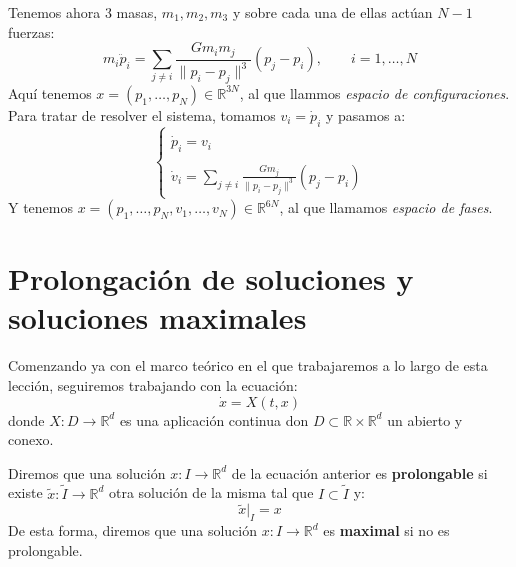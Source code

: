 \begin{ejemplo}
\begin{enumerate}
            Tenemos ahora 3 masas, $m_1,m_2,m_3$ y sobre cada una de ellas actúan $N-1$ fuerzas:
            \begin{equation*}
                m_i \ddot{p}_i = \sum_{j\neq i} \frac{Gm_im_j}{\|p_i-p_j\|^3}(p_j-p_i), \qquad i = 1, \ldots,N
            \end{equation*}
            Aquí tenemos $x=(p_1,\ldots,p_N)\in \mathbb{R}^{3N}$, al que llammos \textit{espacio de configuraciones}.
            Para tratar de resolver el sistema, tomamos $v_i = \dot{p}_i$ y pasamos a:
            \begin{equation*}
                \left\{\begin{array}{l}
                        \\
                        \dot{p}_i = v_i \\
                        \\
                        \dot{v}_i = \displaystyle \sum_{j\neq i} \frac{Gm_j}{\|p_i-p_j\|^3}(p_j- p_i)
                \end{array}\right.
            \end{equation*}
            Y tenemos $x = (p_1, \ldots, p_N, v_1, \ldots, v_N)\in \mathbb{R}^{6N}$, al que llamamos \textit{espacio de fases}.
    \end{enumerate}
\end{ejemplo}

\section{Prolongación de soluciones y soluciones maximales}
\noindent
Comenzando ya con el marco teórico en el que trabajaremos a lo largo de esta lección, seguiremos trabajando con la ecuación:
\begin{equation*}
    \dot{x} = X(t,x)
\end{equation*}
donde $X:D\to \mathbb{R}^d$ es una aplicación continua don $D\subset \mathbb{R}\times \mathbb{R}^d$ un abierto y conexo.

\begin{definicion}
    Diremos que una solución $x:I\to \mathbb{R}^d$ de la ecuación anterior es \textbf{prolongable} si existe $\tilde{x}:\tilde{I}\to \mathbb{R}^d$ otra solución de la misma tal que $I\subset \tilde{I}$ y:
    \begin{equation*}
        \tilde{x}\big|_I = x
    \end{equation*}
    De esta forma, diremos que una solución $x:I\to \mathbb{R}^d$ es \textbf{maximal} si no es prolongable.
\end{definicion}

